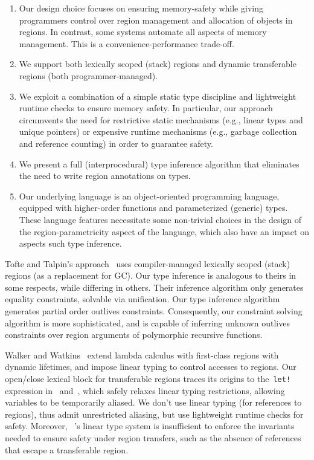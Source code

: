 \documentclass[a4paper,UKenglish]{lipics-v2018}
\newcommand{\C}[1]{\code{#1}}
\newcommand{\code}[1]{\,{\tt #1}\,}
\begin{document}
\begin{enumerate}
\item 
   Our design choice focuses on ensuring memory-safety while giving programmers
   control over  region management and allocation of objects in regions.
   In contrast, some systems automate all aspects of memory management.
   This is a convenience-performance trade-off.

\item We support both lexically scoped (stack) regions and dynamic transferable
regions (both programmer-managed).

\item We exploit a combination of a simple static type discipline and lightweight
  runtime checks to ensure memory safety.
In particular, our approach circumvents the need for restrictive
static mechanisms (e.g., linear types and unique pointers) or
expensive runtime mechanisms (e.g., garbage collection and reference
counting) in order to guarantee safety.

\item We present a full (interprocedural) type inference algorithm
that eliminates the need to write region annotations on types.

\item Our underlying language is an object-oriented programming language,
equipped with higher-order functions and parameterized (generic) types.
These language features necessitate some non-trivial choices in the design
of the region-parametricity aspect of the language, which also have an
impact on aspects such type inference.

\end{enumerate}

Tofte and Talpin's approach~\cite{tofte97} uses compiler-managed
lexically scoped (stack) regions (as a replacement for GC).  Our type
inference is analogous to theirs in some respects, while differing in
others.  Their inference algorithm only generates equality
constraints, solvable via unification.  Our type inference algorithm
generates partial order outlives constraints.  Consequently, our
constraint solving algorithm is more sophisticated, and is capable of
inferring unknown outlives constraints over region arguments of
polymorphic recursive functions.

Walker and Watkins~\cite{WW01} extend lambda calculus with first-class
regions with dynamic lifetimes, and impose linear typing to control
accesses to regions.  Our open/close lexical block for transferable
regions traces its origins to the \C{let!} expression in~\cite{WW01}
and~\cite{wadler90}, which safely relaxes linear typing restrictions,
allowing variables to be temporarily aliased.  We don't use linear
typing (for references to regions), thus admit unrestricted aliasing,
but use lightweight runtime checks for safety.  Moreover,
~\cite{WW01}'s linear type system is insufficient to enforce the
invariants needed to ensure safety under region transfers, such as the
absence of references that escape a transferable region.
\end{document}
